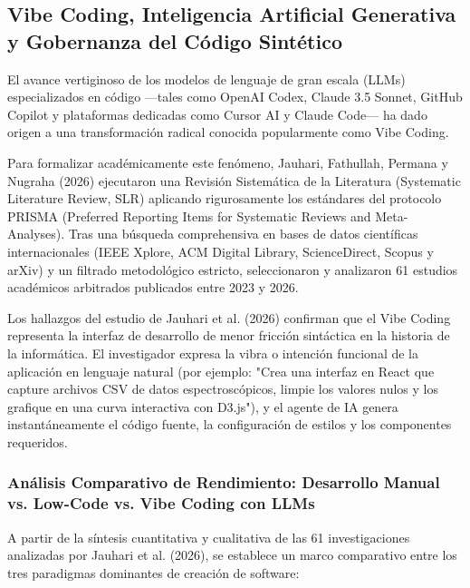 \subsection{Vibe Coding, Inteligencia Artificial Generativa y Gobernanza del Código Sintético}


El avance vertiginoso de los modelos de lenguaje de gran escala (LLMs) especializados en código ---tales como OpenAI Codex, Claude 3.5 Sonnet, GitHub Copilot y plataformas dedicadas como Cursor AI y Claude Code--- ha dado origen a una transformación radical conocida popularmente como Vibe Coding.

Para formalizar académicamente este fenómeno, Jauhari, Fathullah, Permana y Nugraha (2026) ejecutaron una Revisión Sistemática de la Literatura (Systematic Literature Review, SLR) aplicando rigurosamente los estándares del protocolo PRISMA (Preferred Reporting Items for Systematic Reviews and Meta-Analyses). Tras una búsqueda comprehensiva en bases de datos científicas internacionales (IEEE Xplore, ACM Digital Library, ScienceDirect, Scopus y arXiv) y un filtrado metodológico estricto, seleccionaron y analizaron 61 estudios académicos arbitrados publicados entre 2023 y 2026.

Los hallazgos del estudio de Jauhari et al. (2026) confirman que el Vibe Coding representa la interfaz de desarrollo de menor fricción sintáctica en la historia de la informática. El investigador expresa la vibra o intención funcional de la aplicación en lenguaje natural (por ejemplo: "Crea una interfaz en React que capture archivos CSV de datos espectroscópicos, limpie los valores nulos y los grafique en una curva interactiva con D3.js"), y el agente de IA genera instantáneamente el código fuente, la configuración de estilos y los componentes requeridos.

\subsubsection{Análisis Comparativo de Rendimiento: Desarrollo Manual vs. Low-Code vs. Vibe Coding con LLMs}

A partir de la síntesis cuantitativa y cualitativa de las 61 investigaciones analizadas por Jauhari et al. (2026), se establece un marco comparativo entre los tres paradigmas dominantes de creación de software:

